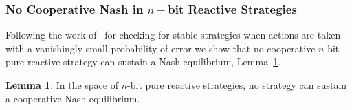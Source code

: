 \documentclass{article}
\theoremstyle{definition}
\newtheorem{lemma}[theorem]{Lemma}
\begin{document}
\subsubsection{No Cooperative Nash in \(n-\)bit Reactive Strategies}

Following the work of~\citep{fundenberg:JSTOR:1990} for checking for stable
strategies when actions are taken with a vanishingly small probability of error
we show that no cooperative \(n\)-bit pure reactive strategy can sustain a Nash
equilibrium, Lemma~\ref{lemma:no_pure_cooperative_nash}.

\begin{lemma}\label{lemma:no_pure_cooperative_nash}
In the space of \(n\)-bit pure reactive strategies, no strategy can sustain
a cooperative Nash equilibrium.
\end{lemma}
\end{document}
